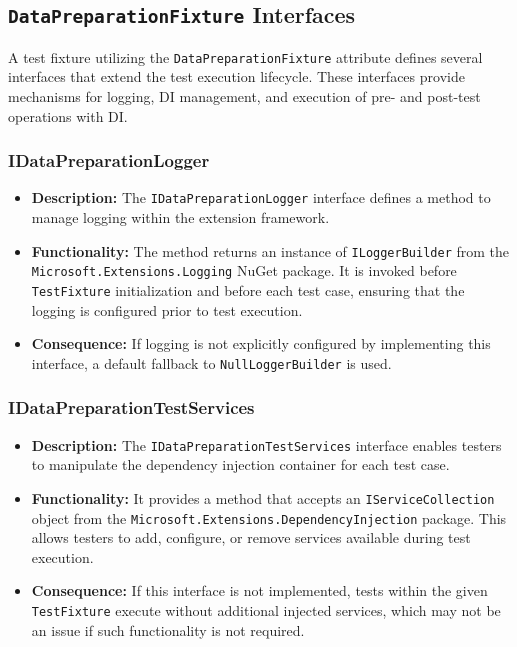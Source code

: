 \subsection{\texttt{DataPreparationFixture} Interfaces}

A test fixture utilizing the \texttt{DataPreparationFixture} attribute defines several interfaces that extend the test execution lifecycle. These interfaces provide mechanisms for logging, \ac{DI} management, and execution of pre- and post-test operations with \ac{DI}.

\subsubsection{IDataPreparationLogger}
\begin{itemize}
    \item \textbf{Description:} The \texttt{IDataPreparationLogger} interface defines a method to manage logging within the extension framework.
    \item \textbf{Functionality:} The method returns an instance of \texttt{ILoggerBuilder} from the \texttt{Microsoft.Extensions.Logging} NuGet package. It is invoked before \texttt{TestFixture} initialization and before each test case, ensuring that the logging is configured prior to test execution.
    \item \textbf{Consequence:} If logging is not explicitly configured by implementing this interface, a default fallback to \texttt{NullLoggerBuilder} is used.
\end{itemize}


\subsubsection{IDataPreparationTestServices}
\begin{itemize}
    \item \textbf{Description:} The \texttt{IDataPreparationTestServices} interface enables testers to manipulate the dependency injection container for each test case.
    \item \textbf{Functionality:} It provides a method that accepts an \texttt{IServiceCollection} object from the \texttt{Microsoft.Extensions.DependencyInjection} package. This allows testers to add, configure, or remove services available during test execution.
    \item \textbf{Consequence:} If this interface is not implemented, tests within the given \texttt{TestFixture} execute without additional injected services, which may not be an issue if such functionality is not required.
\end{itemize}

